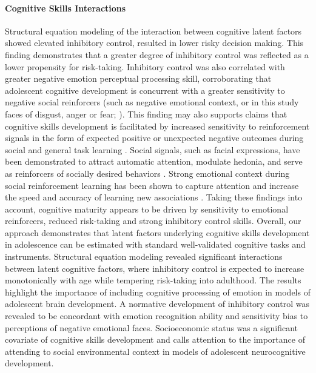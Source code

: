 \documentclass{article}%
\begin{document}
\paragraph*{Cognitive Skills Interactions} Structural equation modeling of the interaction between cognitive latent factors showed elevated inhibitory control, resulted in lower risky decision making. This finding demonstrates that a greater degree of inhibitory control was reflected as a lower propensity for risk-taking. Inhibitory control was also correlated with greater negative emotion perceptual processing skill, corroborating that adolescent cognitive development is concurrent with a greater sensitivity to negative social reinforcers (such as negative emotional context, or in this study faces of disgust, anger or fear; \cite{jones2014adolescent, rosenbaum2020valence}). This finding may also supports claims that cognitive skills development is facilitated by increased sensitivity to reinforcement signals in the form of expected positive or unexpected negative outcomes during social and general task learning \citep{jones2014adolescent, rosenbaum2020valence}. Social signals, such as facial expressions, have been demonstrated to attract automatic attention, modulate hedonia, and serve as reinforcers of socially desired behaviors \citep{teufel2009social,speer2007face}. Strong emotional context during social reinforcement learning has been shown to capture attention and increase the speed and accuracy of learning new associations \citep{vernetti2017gaze,roper2014value}. Taking these findings into account, cognitive maturity appears to be driven by sensitivity to emotional reinforcers, reduced risk-taking and strong inhibitory control skills. Overall, our approach demonstrates that latent factors underlying cognitive skills development in adolescence can be estimated with standard well-validated cognitive tasks and instruments. Structural equation modeling revealed significant interactions between latent cognitive factors, where inhibitory control is expected to increase monotonically with age while tempering risk-taking into adulthood. The results highlight the importance of including cognitive processing of emotion in models of adolescent brain development. A normative development of inhibitory control was revealed to be concordant with emotion recognition ability and sensitivity bias to perceptions of negative emotional faces. Socioeconomic status was a significant covariate of cognitive skills development and calls attention to the importance of attending to social environmental context in models of adolescent neurocognitive development.
%
\end{document}
